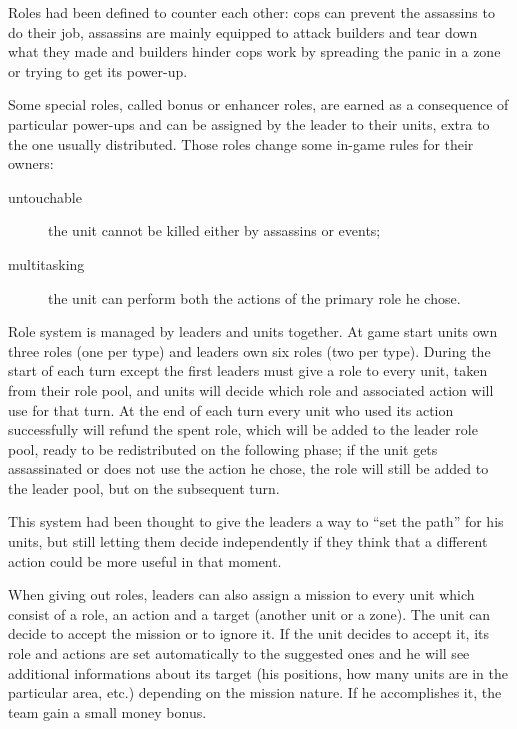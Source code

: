 			Roles had been defined to counter each other: cops can prevent the assassins to do their job, assassins are mainly equipped to attack builders and tear down what they made and builders hinder cops work by spreading the panic in a zone or trying to get its power-up.
			
			Some special roles, called bonus or enhancer roles, are earned as a consequence of particular power-ups and can be assigned by the leader to their units, extra to the one usually distributed.
			Those roles change some in-game rules for their owners:
			\begin{description}
				\item[untouchable] the unit cannot be killed either by assassins or events;
				\item[multitasking] the unit can perform both the actions of the primary role he chose.
			\end{description} 
			
			Role system is managed by leaders and units together.
			At game start units own three roles (one per type) and leaders own six roles (two per type).
			During the start of each turn except the first leaders must give a role to every unit, taken from their role pool, and units will decide which role and associated action will use for that turn.
			At the end of each turn every unit who used its action successfully will refund the spent role, which will be added to the leader role pool, ready to be redistributed on the following phase; if the unit gets assassinated or does not use the action he chose, the role will still be added to the leader pool, but on the subsequent turn.
			
			This system had been thought to give the leaders a way to “set the path” for his units, but still letting them decide independently if they think that a different action could be more useful in that moment.
		
			
			When giving out roles, leaders can also assign a mission to every unit which consist of a role, an action and a target (another unit or a zone).
			The unit can decide to accept the mission or to ignore it. If the unit decides to accept it, its role and actions are set automatically to the suggested ones and he will see additional informations about its target (his positions, how many units are in the particular area, etc.) depending on the mission nature. If he accomplishes it, the team gain a small money bonus.
			
